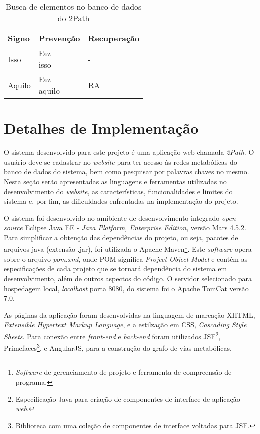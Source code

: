 \indent 
\begin{table}
\centering
\caption{Busca de elementos no banco de dados do 2Path} \label{prevencaoRecuperacao:2Path}
\begin{tabular}{|l|l|l|}
\hline
{\cellcolor[HTML]{DFDFDF}\textbf{Signo}} &  {\cellcolor[HTML]{DFDFDF}\textbf{Prevenção}} &  {\cellcolor[HTML]{DFDFDF}\textbf{Recuperação}}\\ \hline
Isso & \specialcell{Faz\\isso} & -  \\ \hline
Aquilo & \specialcell{Faz\\aquilo} & RA\\ \hline
\end{tabular}
\end{table}


\section{Detalhes de Implementação}


\indent O sistema desenvolvido para este projeto é uma aplicação web chamada \textit{2Path}. O usuário deve se cadastrar no \textit{website} para ter acesso às redes metabólicas do banco de dados do sistema, bem como pesquisar por palavras chaves no mesmo. Nesta seção serão apresentadas as linguagens e ferramentas utilizadas no desenvolvimento do \textit{website}, as características, funcionalidades e limites do sistema e, por fim, as dificuldades enfrentadas na implementação do projeto.

\indent O sistema foi desenvolvido no amibiente de desenvolvimento integrado \textit{open source} Eclipse Java EE - \textit{Java Platform, Enterprise Edition}, versão Mars 4.5.2. Para simplificar a obtenção das dependências do projeto, ou seja, pacotes de arquivos java (extensão .jar), foi utilizada o Apache Maven\footnote{\textit{Software} de gerenciamento de projeto e ferramenta de compreensão de programa.}. Este \textit{software} opera sobre o arquivo \textit{pom.xml}, onde POM significa \textit{Project Object Model} e contém as especificações de cada projeto que se tornará dependência do sistema em desenvolvimento, além de outros aspectos do código. O servidor selecionado para hospedagem local, \textit{localhost} porta 8080, do sistema foi o Apache TomCat versão 7.0.

\indent As páginas da aplicação foram desenvolvidas na linguagem de marcação XHTML, \textit{Extensible Hypertext Markup Language}, e a estilzação em CSS, \textit{Cascading Style Sheets}. Para conexão entre \textit{front-end} e \textit{back-end} foram utilizados JSF\footnote{Especificação Java para criação de componentes de interface de aplicação \textit{web}.}, Primefaces\footnote{Biblioteca com uma coleção de componentes de interface voltadas para JSF.}, e AngularJS, para a construção do grafo de vias metabólicas.

